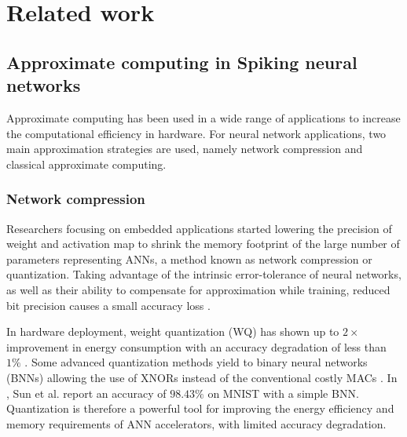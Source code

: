 \section{Related work}
\label{sec:related_work}
\subsection{Approximate computing in Spiking neural networks}
Approximate computing has been used in a wide range of applications to increase the computational efficiency in hardware\cite{han2013approximate}. For neural network applications, two main approximation strategies are used, namely network compression and classical approximate computing\cite{bouvier2019spiking}.

\subsubsection{Network compression}
Researchers focusing on embedded applications started lowering the precision of weight and activation map to shrink the memory footprint of the large number of parameters representing ANNs, a method known as network compression or quantization. Taking advantage of the intrinsic error-tolerance of neural networks, as well as their ability to compensate for approximation while training, reduced bit precision causes a small accuracy loss \cite{courbariaux2015binaryconnect, han2015deep, hubara2017quantized, rastegari2016xnor}.

In hardware deployment, weight quantization (WQ) has shown up to $2\times$ improvement in energy consumption with an accuracy degradation of less than $1\%$ \cite{moons20160, whatmough201714}. Some advanced quantization methods yield to binary neural networks (BNNs) allowing the use of XNORs instead of the conventional costly MACs \cite{rastegari2016xnor}. In \cite{sun2018xnor}, Sun et al. report an accuracy of $98.43\%$ on MNIST with a simple BNN. Quantization is therefore a powerful tool for improving the energy efficiency and memory requirements of ANN accelerators, with limited accuracy degradation.

